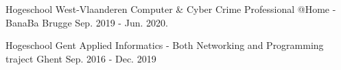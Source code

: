 

\begin{cventries}

\cventry
{Hogeschool West-Vlaanderen} %
{Computer \& Cyber Crime Professional @Home - BanaBa} %
{Brugge} %
{Sep. 2019 - Jun. 2020.} %

\cventry
{Hogeschool Gent} %
{Applied Informatics - Both Networking and Programming traject} %
{Ghent} %
{Sep. 2016 - Dec. 2019} %

\end{cventries}
